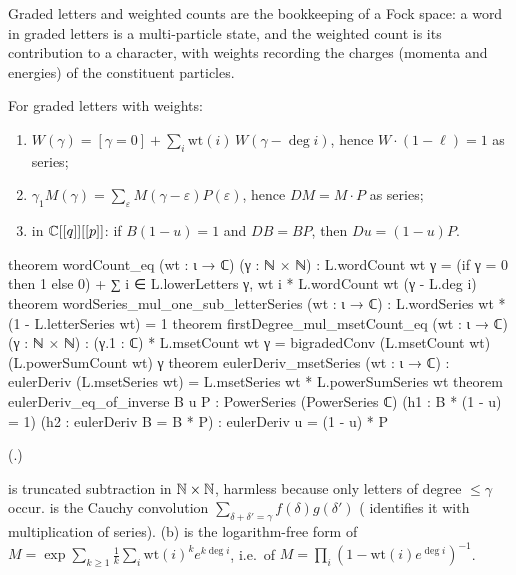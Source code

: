 \begin{physics}
Graded letters and weighted counts are the bookkeeping of a Fock space: a word in graded letters is a multi-particle
state, and the weighted count is its contribution to a character, with weights recording the charges (momenta and
energies) of the constituent particles.
\end{physics}

\begin{theorem}\label{ch19:thm:characters}
For graded letters with weights:
\begin{enumerate}[label=(\alph*)]
\item $W(\gamma)=[\gamma=0]+\sum_i\mathrm{wt}(i)\,W(\gamma-\deg i)$, hence $W\cdot(1-\ell)=1$ as series;
\item $\gamma_1M(\gamma)=\sum_\varepsilon M(\gamma-\varepsilon)P(\varepsilon)$, hence $DM=M\cdot P$ as series;
\item in ${\mathbb{C}}[[q]][[p]]$: if $B(1-u)=1$ and $DB=BP$, then $Du=(1-u)P$.
\end{enumerate}
\end{theorem}
\begin{leancode}
theorem wordCount_eq (wt : ι → ℂ) (γ : ℕ × ℕ) :
    L.wordCount wt γ = (if γ = 0 then 1 else 0) +
      ∑ i ∈ L.lowerLetters γ, wt i * L.wordCount wt (γ - L.deg i)
theorem wordSeries_mul_one_sub_letterSeries (wt : ι → ℂ) :
    L.wordSeries wt * (1 - L.letterSeries wt) = 1
theorem firstDegree_mul_msetCount_eq (wt : ι → ℂ) (γ : ℕ × ℕ) :
    (γ.1 : ℂ) * L.msetCount wt γ = bigradedConv (L.msetCount wt) (L.powerSumCount wt) γ
theorem eulerDeriv_msetSeries (wt : ι → ℂ) :
    eulerDeriv (L.msetSeries wt) = L.msetSeries wt * L.powerSumSeries wt
theorem eulerDeriv_eq_of_inverse {B u P : PowerSeries (PowerSeries ℂ)} (h1 : B * (1 - u) = 1)
    (h2 : eulerDeriv B = B * P) : eulerDeriv u = (1 - u) * P
\end{leancode}
(.)
\begin{dictionary}
 is truncated subtraction in ${\mathbb{N}}\times{\mathbb{N}}$, harmless because only letters of degree $\le\gamma$ occur.
 is the Cauchy convolution $\sum_{\delta+\delta'=\gamma}f(\delta)g(\delta')$ (
identifies it with multiplication of series).  (b) is the logarithm-free form of
$M=\exp\sum_{k\ge1}\frac1k\sum_i\mathrm{wt}(i)^ke^{k\deg i}$, i.e.\ of $M=\prod_i(1-\mathrm{wt}(i)e^{\deg i})^{-1}$.
\end{dictionary}
